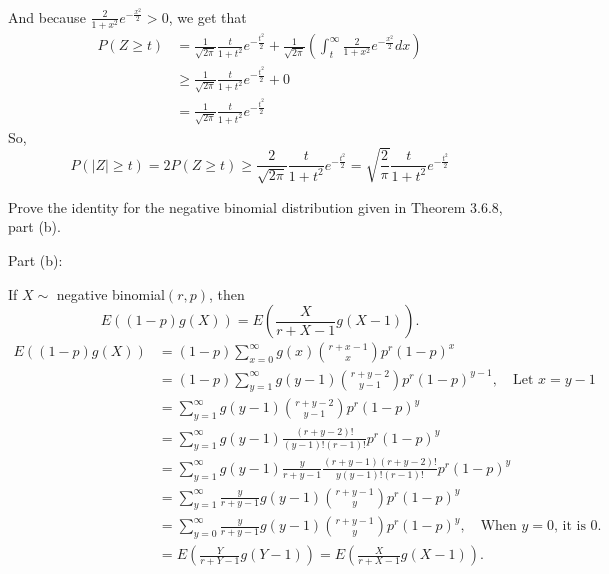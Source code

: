 \documentclass[14pt]{elegantbook}
\begin{document}
\begin{solution}
\begin{align*}
        \end{align*}
        And because $\frac{2}{1+x^2}e^{-\frac{x^2}{2}}>0$, we get that
        \begin{align*}
            P(Z\geq t)
            &=\frac{1}{\sqrt{2\pi}}\frac{t}{1+t^2}e^{-\frac{t^2}{2}}+\frac{1}{\sqrt{2\pi}}\left(\int_{t}^{\infty}\frac{2}{1+x^2}e^{-\frac{x^2}{2}}dx\right)\\
            &\geq\frac{1}{\sqrt{2\pi}}\frac{t}{1+t^2}e^{-\frac{t^2}{2}}+0\\
            &=\frac{1}{\sqrt{2\pi}}\frac{t}{1+t^2}e^{-\frac{t^2}{2}}
        \end{align*}
        So, \[P(|Z|\geq t)=2P(Z\geq t)\geq\frac{2}{\sqrt{2\pi}}\frac{t}{1+t^2}e^{-\frac{t^2}{2}}= \sqrt{\frac{2}{\pi}}\frac{t}{1+t^2}e^{-\frac{t^2}{2}}\]

    \end{solution}

    \setcounter{exer}{49}
    \begin{exercise}
        Prove the identity for the negative binomial distribution given in Theorem 3.6.8, part (b). 
    \end{exercise}

    \begin{solution}
        Part (b): 

        If $X\sim $ negative binomial$(r,p)$, then 
        \[E((1-p)g(X))=E\left(\frac{X}{r+X-1}g(X-1)\right). \]
        \begin{align*}
            E((1-p)g(X))&=(1-p)\sum_{x=0}^\infty g(x)\binom{r+x-1}{x}p^r(1-p)^x\\
            &=(1-p)\sum_{y=1}^\infty g(y-1)\binom{r+y-2}{y-1}p^r(1-p)^{y-1},\quad \text{Let $x = y-1$}\\
            &=\sum_{y=1}^\infty g(y-1)\binom{r+y-2}{y-1}p^r(1-p)^{y}\\
            &=\sum_{y=1}^\infty g(y-1)\frac{(r+y-2)!}{(y-1)!(r-1)!}p^r(1-p)^{y}\\
            &=\sum_{y=1}^\infty g(y-1)\frac{y}{r+y-1}\frac{(r+y-1)(r+y-2)!}{y(y-1)!(r-1)!}p^r(1-p)^{y}\\
            &=\sum_{y=1}^\infty \frac{y}{r+y-1}g(y-1) \binom{r+y-1}{y}p^r(1-p)^{y}\\
            &=\sum_{y=0}^\infty \frac{y}{r+y-1}g(y-1) \binom{r+y-1}{y}p^r(1-p)^{y},\quad \text{When $y=0$, it is $0$.}\\
            &=E\left(\frac{Y}{r+Y-1}g(Y-1)\right)=E\left(\frac{X}{r+X-1}g(X-1)\right). 
        \end{align*}
    \end{solution}
    
\end{document}
